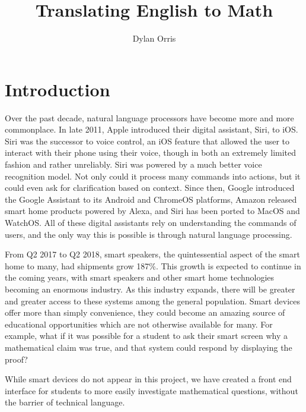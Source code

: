 \documentclass[12pt]{article}
\begin{document}
\title{Translating English to Math}
\author{Dylan Orris}
\maketitle
\tableofcontents
\pagebreak
\section{Introduction}
Over the past decade, natural language processors have become more and more commonplace. In late 2011, Apple introduced their digital assistant, Siri, to iOS. Siri was the successor to voice control, an iOS feature that allowed the user to interact with their phone using their voice, though in both an extremely limited fashion and rather unreliably. Siri was powered by a much better voice recognition model. Not only could it process many commands into actions, but it could even ask for clarification based on context. Since then, Google introduced the Google Assistant to its Android and ChromeOS platforms, Amazon released smart home products powered by Alexa, and Siri has been ported to MacOS and WatchOS. All of these digital assistants rely on understanding the commands of users, and the only way this is possible is through natural language processing. 

From Q2 2017 to Q2 2018, smart speakers, the quintessential aspect of the smart home to many, had shipments grow 187\%. \cite{canalys} %
This growth is expected to continue in the coming years, with smart speakers and other smart home technologies becoming an enormous industry. As this industry expands, there will be greater and greater access to these systems among the general population. Smart devices offer more than simply convenience, they could become an amazing source of educational opportunities which are not otherwise available for many. For example, what if it was possible for a student to ask their smart screen why a mathematical claim was true, and that system could respond by displaying the proof? 

While smart devices do not appear in this project, we have created a front end interface for students to more easily investigate mathematical questions, without the barrier of technical language.
\end{document}

